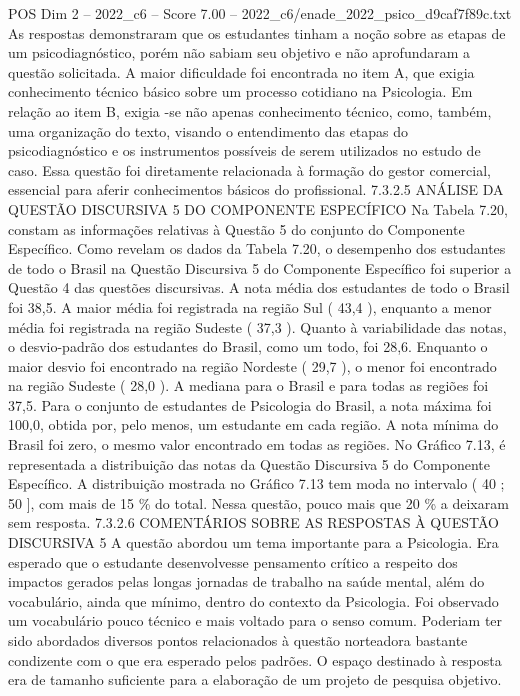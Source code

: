 \begin{textsample}{POS Dim 2 – 2022\_c6 – Score 7.00 – 2022\_c6/enade\_2022\_psico\_d9caf7f89c.txt}
As respostas demonstraram que os estudantes tinham a noção sobre as etapas de um psicodiagnóstico, porém não sabiam seu objetivo e não aprofundaram a questão solicitada.
A maior dificuldade foi encontrada no item A, que exigia conhecimento técnico básico sobre um processo cotidiano na Psicologia.
Em relação ao item B, exigia -se não apenas conhecimento técnico, como, também, uma organização do texto, visando o entendimento das etapas do psicodiagnóstico e os instrumentos possíveis de serem utilizados no estudo de caso.
Essa questão foi diretamente relacionada à formação do gestor comercial, essencial para aferir conhecimentos básicos do profissional. 7.3.2.5 ANÁLISE DA QUESTÃO DISCURSIVA 5 DO COMPONENTE ESPECÍFICO Na Tabela 7.20, constam as informações relativas à Questão 5 do conjunto do Componente Específico.
Como revelam os dados da Tabela 7.20, o desempenho dos estudantes de todo o Brasil na Questão Discursiva 5 do Componente Específico foi superior a Questão 4 das questões discursivas.
A nota média dos estudantes de todo o Brasil foi 38,5.
A maior média foi registrada na região Sul ( 43,4 ), enquanto a menor média foi registrada na região Sudeste ( 37,3 ).
Quanto à variabilidade das notas, o desvio-padrão dos estudantes do Brasil, como um todo, foi 28,6.
Enquanto o maior desvio foi encontrado na região Nordeste ( 29,7 ), o menor foi encontrado na região Sudeste ( 28,0 ).
A mediana para o Brasil e para todas as regiões foi 37,5.
Para o conjunto de estudantes de Psicologia do Brasil, a nota máxima foi 100,0, obtida por, pelo menos, um estudante em cada região.
A nota mínima do Brasil foi zero, o mesmo valor encontrado em todas as regiões.
No Gráfico 7.13, é representada a distribuição das notas da Questão Discursiva 5 do Componente Específico.
A distribuição mostrada no Gráfico 7.13 tem moda no intervalo ( 40 ; 50 ], com mais de 15 \% do total.
Nessa questão, pouco mais que 20 \% a deixaram sem resposta. 7.3.2.6 COMENTÁRIOS SOBRE AS RESPOSTAS À QUESTÃO DISCURSIVA 5 A questão abordou um tema importante para a Psicologia.
Era esperado que o estudante desenvolvesse pensamento crítico a respeito dos impactos gerados pelas longas jornadas de trabalho na saúde mental, além do vocabulário, ainda que mínimo, dentro do contexto da Psicologia.
Foi observado um vocabulário pouco técnico e mais voltado para o senso comum.
Poderiam ter sido abordados diversos pontos relacionados à questão norteadora bastante condizente com o que era esperado pelos padrões.
O espaço destinado à resposta era de tamanho suficiente para a elaboração de um projeto de pesquisa objetivo.

\end{textsample}
